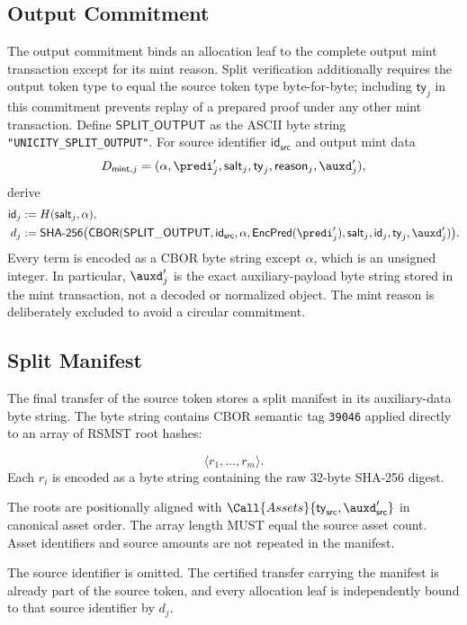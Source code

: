 \subsection{Output Commitment}\label{app:split-output-commitment}

The output commitment binds an allocation leaf to the complete output mint transaction except for its mint reason. Split verification additionally requires the output token type to equal the source token type byte-for-byte; including $\mathsf{ty}_j$ in this commitment prevents replay of a prepared proof under any other mint transaction. Define $\mathsf{SPLIT\_OUTPUT}$ as the ASCII byte string \texttt{"UNICITY\_SPLIT\_OUTPUT"}. For source identifier $\mathsf{id}_\mathsf{src}$ and output mint data
\[
D_{\mathsf{mint},j}
=(\alpha,\predi'_j,\mathsf{salt}_j,\mathsf{ty}_j,
  \mathsf{reason}_j,\auxd'_j),
\]
derive
\[
\begin{split}
\mathsf{id}_j &:= H(\mathsf{salt}_j,\alpha),\\
d_j &:= \mathsf{SHA\text{-}256}\bigl(\mathsf{CBOR}(
  \mathsf{SPLIT\_OUTPUT},
  \mathsf{id}_\mathsf{src},
  \alpha,
  \encpred(\predi'_j),
  \mathsf{salt}_j,
  \mathsf{id}_j,
  \mathsf{ty}_j,
  \auxd'_j
)\bigr).
\end{split}
\]
Every term is encoded as a CBOR byte string except $\alpha$, which is an unsigned integer. In particular, $\auxd'_j$ is the exact auxiliary-payload byte string stored in the mint transaction, not a decoded or normalized object. The mint reason is deliberately excluded to avoid a circular commitment.

\subsection{Split Manifest}\label{app:split-manifest}

The final transfer of the source token stores a split manifest in its auxiliary-data byte string. The byte string contains CBOR semantic tag \texttt{39046} applied directly to an array of RSMST root hashes:

\[
\langle r_1,\ldots,r_m\rangle.
\]
Each $r_i$ is encoded as a byte string containing the raw 32-byte SHA-256 digest.

The roots are positionally aligned with $\Call{Assets}{\mathsf{ty}_\mathsf{src},\auxd'_\mathsf{src}}$ in canonical asset order. The array length MUST equal the source asset count. Asset identifiers and source amounts are not repeated in the manifest.

The source identifier is omitted. The certified transfer carrying the manifest is already part of the source token, and every allocation leaf is independently bound to that source identifier by $d_j$.

